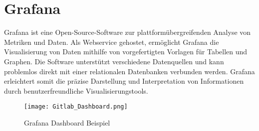 \section{Grafana}\label{sec:Grafana}
Grafana ist eine Open-Source-Software zur plattformübergreifenden Analyse von Metriken und Daten. Als Webservice gehostet, ermöglicht Grafana die Visualisierung von Daten mithilfe von vorgefertigten Vorlagen für Tabellen und Graphen. Die Software unterstützt verschiedene Datenquellen und kann problemlos direkt mit einer relationalen Datenbanken verbunden werden. Grafana erleichtert somit die präzise Darstellung und Interpretation von Informationen durch benutzerfreundliche Visualisierungstools. \cite{GrafanaWebsite}\\
\vspace{-1cm}
\begin{center}
    \begin{figure}[h]
     \centering
     \texttt{[image: Gitlab\_Dashboard.png]}
     \caption{Grafana Dashboard Beispiel \cite{GrafanaWebsite}}
     \label{fig:GRafanaDashboard}
    \end{figure}
   \end{center}
